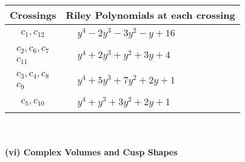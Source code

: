 \documentclass[1p]{elsarticle_modified}
\theoremstyle{definition}
\begin{document}
\begin{tabular}{m{50pt}|m{274pt}}
Crossings & \hspace{64pt}Riley Polynomials at each crossing \\
\hline $$\begin{aligned}c_{1},c_{12}\end{aligned}$$&$\begin{aligned}
&y^4-2 y^3-3 y^2- y+16
\end{aligned}$\\
\hline $$\begin{aligned}c_{2},c_{6},c_{7}\\c_{11}\end{aligned}$$&$\begin{aligned}
&y^4+2 y^3+y^2+3 y+4
\end{aligned}$\\
\hline $$\begin{aligned}c_{3},c_{4},c_{8}\\c_{9}\end{aligned}$$&$\begin{aligned}
&y^4+5 y^3+7 y^2+2 y+1
\end{aligned}$\\
\hline $$\begin{aligned}c_{5},c_{10}\end{aligned}$$&$\begin{aligned}
&y^4+y^3+3 y^2+2 y+1
\end{aligned}$\\
\hline
\end{tabular}\\~\\
\newpage\flushleft \textbf{(vi) Complex Volumes and Cusp Shapes}
\end{document}

